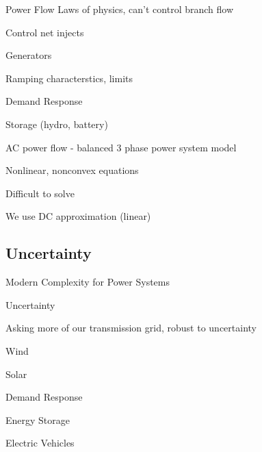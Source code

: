 \begin{frame}{Power Flow}
Laws of physics, can't control branch flow

\alert{Control net injects}
\bi
\item Generators
\bi 
\item Ramping characterstics, limits
\ei
\item Demand Response
\item Storage (hydro, battery)
\ei

\pause

AC power flow - balanced 3 phase power system model 
\bi
\item Nonlinear, nonconvex equations
\item Difficult to solve
\item \alert{We use DC approximation (linear)}
\ei

\end{frame}

\subsection{Uncertainty}
\begin{frame}{Modern Complexity for Power Systems}

\alert{Uncertainty}

Asking more of our transmission grid, robust to uncertainty

\bi
\item Wind
\item Solar
\item Demand Response
\item Energy Storage
\item Electric Vehicles
\ei
\end{frame}


